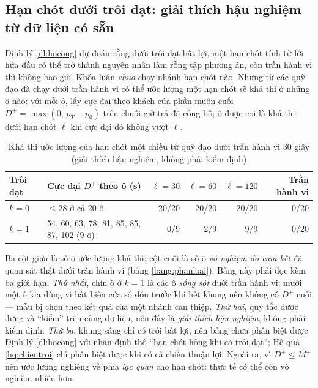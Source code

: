 \subsection{Hạn chót dưới trôi dạt: giải thích hậu nghiệm từ dữ liệu có sẵn}
\label{muc:haunghiem}

Định lý \ref{dl:hocong} dự đoán rằng dưới trôi dạt bất lợi, một hạn chót tính từ lời hứa đầu có
thể trở thành nguyên nhân làm rỗng tập phương án, còn trần hành vi thì không bao giờ. Khóa luận
\emph{chưa} chạy nhánh hạn chót nào. Nhưng từ các quỹ đạo đã chạy dưới trần hành vi có thể ước
lượng một hạn chót sẽ khả thi ở những ô nào: với mỗi ô, lấy cực đại theo khách của phần muộn cuối
$D^{+} = \max(0,\, p_T - p_0)$ trên chuỗi giờ trả đã công bố; ô được coi là khả thi dưới hạn chót
$\ell$ khi cực đại đó không vượt $\ell$.

\begin{table}[htbp]
\centering
\caption{Khả thi ước lượng của hạn chót một chiều từ quỹ đạo dưới trần hành vi 30 giây (giải
thích hậu nghiệm, không phải kiểm định)}
\label{bang:haunghiem}
\small
\begin{tabular}{@{}lp{4.2cm}rrrr@{}}
\toprule
\textbf{Trôi dạt} & \textbf{Cực đại $D^{+}$ theo ô (s)} & $\ell = 30$ & $\ell = 60$ & $\ell = 120$
& \textbf{Trần hành vi}\\
\midrule
$k = 0$ & $\le 28$ ở cả 20 ô & 20/20 & 20/20 & 20/20 & 0/20\\
$k = 1$ & 54, 60, 63, 78, 81, 85, 85, 87, 102 (9 ô) & 0/9 & 2/9 & 9/9 & 0/20\\
\bottomrule
\end{tabular}
\end{table}

Ba cột giữa là số ô ước lượng khả thi; cột cuối là số ô \emph{vô nghiệm do cam kết} đã quan sát
thật dưới trần hành vi (bảng \ref{bang:phanloai}). Bảng này phải đọc kèm ba giới hạn.
\emph{Thứ nhất}, chín ô ở $k = 1$ là các ô \emph{sống sót} dưới trần hành vi; mười một ô kia dừng
vì bất biến cửa sổ đón trước khi hết khung nên không có $D^{+}$ cuối --- mẫu bị chọn theo kết quả
của một nhánh can thiệp. \emph{Thứ hai}, quy tắc được dựng và ``kiểm'' trên cùng dữ liệu, nên đây là
\emph{giải thích hậu nghiệm}, không phải kiểm định. \emph{Thứ ba}, khung sáng chỉ có trôi bất lợi,
nên bảng chưa phân biệt được Định lý \ref{dl:hocong} với nhận định thô ``hạn chót hỏng khi có trôi
dạt''; Hệ quả \ref{hq:chieutroi} chỉ phân biệt được khi có cả chiều thuận lợi. Ngoài ra, vì
$D^{+} \le M^{+}$ nên ước lượng nghiêng về phía \emph{lạc quan} cho hạn chót: thực tế có thể còn vô
nghiệm nhiều hơn.

